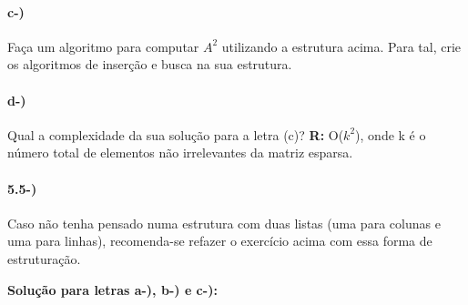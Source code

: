 \documentclass[portuguese,12pt,a4paper]{article}
\begin{document}
\paragraph{c-)}
Faça um algoritmo para computar $A^2$ utilizando a estrutura acima. Para tal, crie os algoritmos de inserção e busca na sua estrutura.
\paragraph{d-)}
Qual a complexidade da sua solução para a letra (c)?
\newline\newline
\textbf{R:} O($k^2$), onde k é o número total de elementos não irrelevantes da matriz esparsa.

\paragraph{5.5-)}
Caso não tenha pensado numa estrutura com duas listas (uma para colunas e uma para
linhas), recomenda-se refazer o exercício acima com essa forma de estruturação.\newline\newline\newline\newline

\textbf{Solução para letras a-), b-) e c-):}
\end{document}
